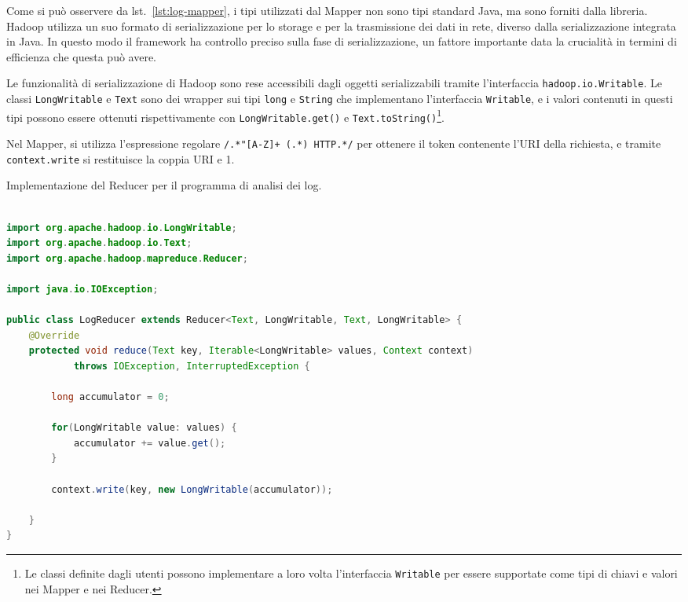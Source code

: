 \documentclass[italian,a4paper, twoside, 12pt]{report}
\begin{document}
Come si può osservere da lst.~\ref{lst:log-mapper}, i tipi utilizzati
dal Mapper non sono tipi standard Java, ma sono forniti dalla libreria.
Hadoop utilizza un suo formato di serializzazione per lo storage e per
la trasmissione dei dati in rete, diverso dalla serializzazione
integrata in Java. In questo modo il framework ha controllo preciso
sulla fase di serializzazione, un fattore importante data la crucialità
in termini di efficienza che questa può avere.

Le funzionalità di serializzazione di Hadoop sono rese accessibili dagli
oggetti serializzabili tramite l'interfaccia
\lstinline!hadoop.io.Writable!. Le classi \lstinline!LongWritable! e
\lstinline!Text! sono dei wrapper sui tipi \lstinline!long! e
\lstinline!String! che implementano l'interfaccia \lstinline!Writable!,
e i valori contenuti in questi tipi possono essere ottenuti
rispettivamente con \lstinline!LongWritable.get()! e
\lstinline!Text.toString()!\footnote{Le classi definite dagli utenti
  possono implementare a loro volta l'interfaccia \lstinline!Writable!
  per essere supportate come tipi di chiavi e valori nei Mapper e nei
  Reducer.}.

Nel Mapper, si utilizza l'espressione regolare
\lstinline!/.*"[A-Z]+ (.*) HTTP.*/! per ottenere il token contenente
l'URI della richiesta, e tramite \lstinline!context.write! si
restituisce la coppia URI e 1.

\begin{codelisting}

\caption{Implementazione del Reducer per il programma di analisi dei
log.}

\begin{lstlisting}[language=Java, label=lst:log-reducer]

import org.apache.hadoop.io.LongWritable;
import org.apache.hadoop.io.Text;
import org.apache.hadoop.mapreduce.Reducer;

import java.io.IOException;

public class LogReducer extends Reducer<Text, LongWritable, Text, LongWritable> {
    @Override
    protected void reduce(Text key, Iterable<LongWritable> values, Context context)
            throws IOException, InterruptedException {

        long accumulator = 0;

        for(LongWritable value: values) {
            accumulator += value.get();
        }

        context.write(key, new LongWritable(accumulator));

    }
}
\end{lstlisting}

\end{codelisting}
\end{document}
